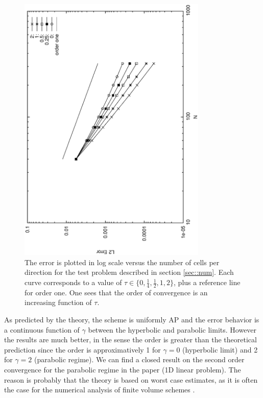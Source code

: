 \documentclass[a4paper,french,english,10pt]{article}
\begin{document}
\begin{figure}
\begin{center}
\includegraphics[width=9cm,angle=-90]{sortie_enfin.eps}
\end{center}
\caption{The error is plotted in log scale versus the number of cells per direction for the test problem described
in section \ref{sec::num}.
Each curve corresponds to a value of $\tau\in\{0,\frac14, \frac12, 1, 2  \}$, plus 
a reference line for order one. One sees that the order of convergence is an increasing function
of $\tau$.}
\label{fig1}
\end{figure}

As predicted by  the theory, the scheme is uniformly AP and the error behavior is a continuous function of $\gamma$
between the  hyperbolic and parabolic limits. However the results are much better, in the sense
the order is greater than the theoretical prediction since
the order is approximatively 1 for $\gamma=0$ (hyperbolic limit)
and 2 for $\gamma=2$ (parabolic regime).  We can find a closed result on the second order convergence for the parabolic regime in the paper \cite{TAHO} (1D linear problem).
The reason is probably that the theory is based on worst case estimates, as it is often the case for the numerical analysis
of finite volume schemes \cite{FV}.


\end{document}
